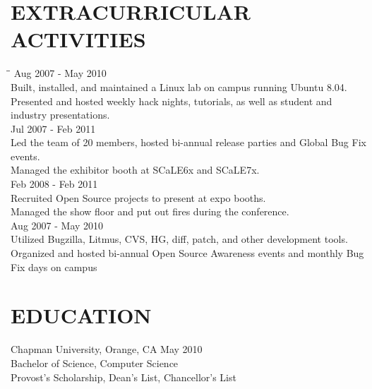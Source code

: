 \documentclass{res}
\begin{document}
\begin{resume}
\section{EXTRACURRICULAR ACTIVITIES}
	\vspace{-5pt}
  \begin{tabbing}
  \hspace{2.5in}\= \hspace{3.45in}\= \kill %
  \hspace{-0.25in}{\bf President, Chapman University ACM} \> \> Aug 2007 - May 2010\\
    Built, installed, and maintained a Linux lab on campus running Ubuntu 8.04.\\
    Presented and hosted weekly hack nights, tutorials, as well as student and industry presentations.\\
  \hspace{-0.25in}{\bf Ubuntu Member and Community Leader, Ubuntu California Local Community Team} \> \> Jul 2007 - Feb 2011\\
    Led the team of 20 members, hosted bi-annual release parties and Global Bug Fix events.\\
    Managed the exhibitor booth at SCaLE6x and SCaLE7x. \\
  \hspace{-0.25in}{\bf Community Relations Committee, Southern California Linux Expo} \> \> Feb 2008 - Feb 2011\\
    Recruited Open Source projects to present at expo booths.\\
    Managed the show floor and put out fires during the conference.\\
  \hspace{-0.25in}{\bf Campus Rep, Mozilla Firefox} \> \> Aug 2007 - May 2010\\
    Utilized Bugzilla, Litmus, CVS, HG, diff, patch, and other development tools.\\
    Organized and hosted bi-annual Open Source Awareness events and monthly Bug Fix days on campus \\
  \end{tabbing}
  \vspace{-0.4in}

\section{EDUCATION}
  \vspace{2pt}
    Chapman University, Orange, CA \hspace{3.8in} May 2010\\
    Bachelor of Science, Computer Science \\
    Provost's Scholarship, Dean's List, Chancellor's List\\
  \vspace{-0.4in}

\end{resume}
\end{document}
